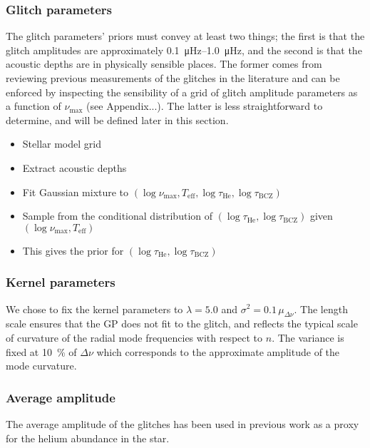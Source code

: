 \documentclass[linenumbers,modern]{aastex631}
\newcommand{\helium}{\mathrm{He}}
\newcommand{\bcz}{\mathrm{BCZ}}
\begin{document}
\subsubsection{Glitch parameters} \label{sec:glitch-params}

The glitch parameters' priors must convey at least two things; the first is
that the glitch amplitudes are approximately \SIrange{0.1}{1.0}{\micro\hertz}, 
and the second is that the acoustic depths are in physically sensible places.
The former comes from reviewing previous measurements of the glitches in the
literature and can be enforced by inspecting the sensibility of a grid of
glitch amplitude parameters as a function of \(\nu_\mathrm{max}\) (see
Appendix...). The latter is less straightforward to determine, and will be
defined later in this section.

\begin{itemize}
    \item Stellar model grid
    \item Extract acoustic depths
    \item Fit Gaussian mixture to \((\log\nu_\mathrm{max}, T_\mathrm{eff},
        \log\tau_\helium, \log\tau_\bcz)\)
    \item Sample from the conditional distribution of \((\log\tau_\helium,
        \log\tau_\bcz)\) given \((\log\nu_\mathrm{max}, T_\mathrm{eff})\)
    \item This gives the prior for \((\log\tau_\helium, \log\tau_\bcz)\)
\end{itemize}

\subsubsection{Kernel parameters} \label{sec:kernel-params}

We chose to fix the kernel parameters to \(\lambda = 5.0\) and \(\sigma^2 =
0.1 \, \mu_{\Delta\nu}\). The length scale ensures that the GP does not fit to
the glitch, and reflects the typical scale of curvature of the radial mode
frequencies with respect to \(n\). The variance is fixed at \SI{10}{\percent}
of \(\Delta\nu\) which corresponds to the approximate amplitude of the mode
curvature.

\subsubsection{Average amplitude} \label{sec:avg-amp}

The average amplitude of the glitches has been used in previous work as a proxy
for the helium abundance in the star.
\end{document}
